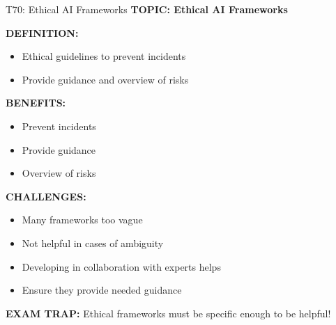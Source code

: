 \documentclass[8pt]{beamer}
\begin{document}
	\begin{frame}{T70: Ethical AI Frameworks}
		\fontsize{6.5}{7.5}\selectfont
		\textbf{TOPIC: Ethical AI Frameworks}
		
		\vspace{0.1cm}
		\textbf{DEFINITION:}
		\begin{itemize}
			\item Ethical guidelines to prevent incidents
			\item Provide guidance and overview of risks
		\end{itemize}
		
		\vspace{0.1cm}
		\textbf{BENEFITS:}
		\begin{itemize}
			\item Prevent incidents
			\item Provide guidance
			\item Overview of risks
		\end{itemize}
		
		\vspace{0.1cm}
		\textbf{CHALLENGES:}
		\begin{itemize}
			\item Many frameworks too vague
			\item Not helpful in cases of ambiguity
			\item Developing in collaboration with experts helps
			\item Ensure they provide needed guidance
		\end{itemize}
		
		\textcolor{myred}{\textbf{EXAM TRAP:}} Ethical frameworks must be \textcolor{myblue}{specific enough to be helpful}!
	\end{frame}
	
\end{document}
